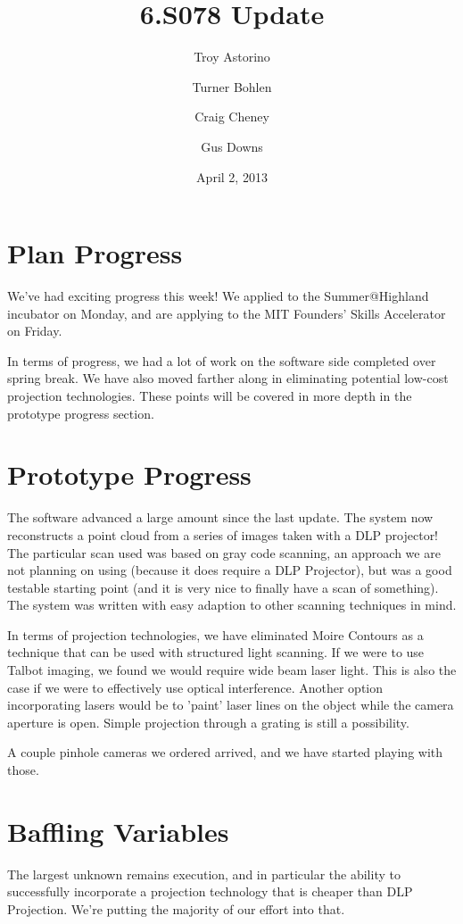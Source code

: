 \documentclass[10pt]{article}
\title{\vspace{-4em}6.S078 Update}
\author{Troy Astorino \and Turner Bohlen \and Craig Cheney \and Gus Downs}
\date{April 2, 2013}
\begin{document}
\maketitle
\vspace{-4em}

\section{Plan Progress}
We've had exciting progress this week!  We applied to the Summer@Highland
incubator on Monday, and are applying to the MIT Founders' Skills Accelerator on
Friday. 

In terms of progress, we had a lot of work on the software side completed over
spring break.  We have
also moved farther along in eliminating potential low-cost projection
technologies. These points will be covered in more depth in the prototype
progress section.

\section{Prototype Progress}
The software advanced a large amount since the last update. The system now
reconstructs a point cloud from a series of images taken with a DLP projector!
The particular scan used was based on gray code scanning, an approach we are not
planning on using (because it does require a DLP Projector), but was a good
testable starting point (and 
it is very nice to finally have a scan of something).  The system was written
with easy adaption to other scanning techniques in mind.

In terms of projection technologies, we have eliminated Moire Contours as a
technique that can be used with structured light scanning.  If we were to use
Talbot imaging, we found we would require wide beam laser light.  This is also
the case if we were to effectively use optical interference.  Another option
incorporating lasers would be to 'paint' laser lines on the object while
the camera aperture is open. Simple projection through a grating is still a possibility.

A couple pinhole cameras we ordered arrived, and we have started playing with those.

\section{Baffling Variables}
The largest unknown remains execution, and in particular the ability to
successfully incorporate a projection technology that is cheaper than DLP
Projection. We're putting the majority of our effort into that.
\end{document}
